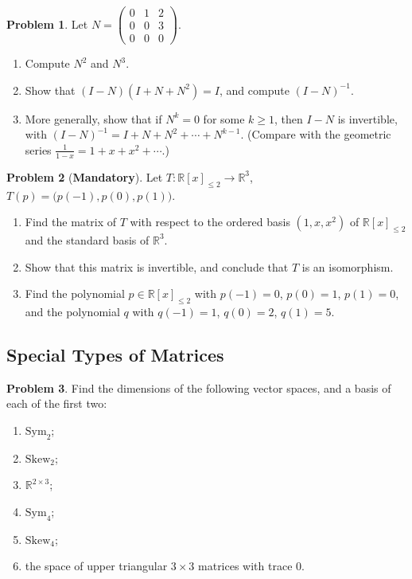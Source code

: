 \documentclass[11pt]{article}
\theoremstyle{definition}
\newtheorem{problem}{Problem}[section]
\newcommand{\mandatory}{\textcolor{red!70!black}{\textbf{Mandatory}}}
\begin{document}
\begin{problem}\label{pr:nilpotent}
    Let $N = \begin{pmatrix} 0 & 1 & 2 \\ 0 & 0 & 3 \\ 0 & 0 & 0 \end{pmatrix}$.
    \begin{enumerate}[label=(\alph*)]
        \item Compute $N^2$ and $N^3$.
        \item Show that $(I - N)(I + N + N^2) = I$, and compute $(I - N)^{-1}$.
        \item More generally, show that if $N^k = 0$ for some $k \geq 1$, then $I - N$ is invertible, with $(I - N)^{-1} = I + N + N^2 + \cdots + N^{k-1}$. (Compare with the geometric series $\frac{1}{1 - x} = 1 + x + x^2 + \cdots$.)
    \end{enumerate}
\end{problem}

\begin{problem}[\mandatory]\label{pr:interpolation}
    Let $T: \mathbb{R}[x]_{\leq 2} \to \mathbb{R}^3$, $T(p) = \big(p(-1), p(0), p(1)\big)$.
    \begin{enumerate}[label=(\alph*)]
        \item Find the matrix of $T$ with respect to the ordered basis $(1, x, x^2)$ of $\mathbb{R}[x]_{\leq 2}$ and the standard basis of $\mathbb{R}^3$.
        \item Show that this matrix is invertible, and conclude that $T$ is an isomorphism.
        \item Find the polynomial $p \in \mathbb{R}[x]_{\leq 2}$ with $p(-1) = 0$, $p(0) = 1$, $p(1) = 0$, and the polynomial $q$ with $q(-1) = 1$, $q(0) = 2$, $q(1) = 5$.
    \end{enumerate}
\end{problem}

\subsection{Special Types of Matrices}

\begin{problem}\label{pr:dims-special}
    Find the dimensions of the following vector spaces, and a basis of each of the first two:
    \begin{enumerate}[label=(\alph*)]
        \item $\mathrm{Sym}_2$;
        \item $\mathrm{Skew}_2$;
        \item $\mathbb{R}^{2 \times 3}$;
        \item $\mathrm{Sym}_4$;
        \item $\mathrm{Skew}_4$;
        \item the space of upper triangular $3 \times 3$ matrices with trace $0$.
    \end{enumerate}
\end{problem}
\end{document}
